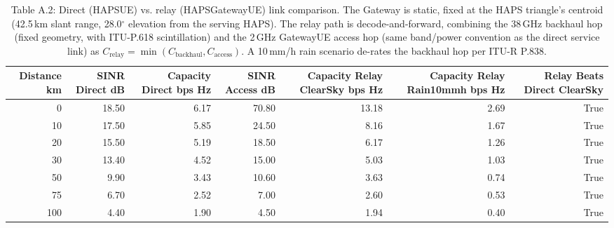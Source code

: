 \begin{table}[htbp]
\centering
\small
\begin{tabular}{rrrrrrr}
\toprule
Distance km & SINR Direct dB & Capacity Direct bps Hz & SINR Access dB & Capacity Relay ClearSky bps Hz & Capacity Relay Rain10mmh bps Hz & Relay Beats Direct ClearSky \\
\midrule
0 & 18.50 & 6.17 & 70.80 & 13.18 & 2.69 & True \\
10 & 17.50 & 5.85 & 24.50 & 8.16 & 1.67 & True \\
20 & 15.50 & 5.19 & 18.50 & 6.17 & 1.26 & True \\
30 & 13.40 & 4.52 & 15.00 & 5.03 & 1.03 & True \\
50 & 9.90 & 3.43 & 10.60 & 3.63 & 0.74 & True \\
75 & 6.70 & 2.52 & 7.00 & 2.60 & 0.53 & True \\
100 & 4.40 & 1.90 & 4.50 & 1.94 & 0.40 & True \\
\bottomrule
\end{tabular}

\caption{Table A.2: Direct (HAPS\textrightarrow UE) vs. relay (HAPS\textrightarrow Gateway\textrightarrow UE) link comparison. The Gateway is static, fixed at the HAPS triangle's centroid (42.5\,km slant range, 28.0$^\circ$ elevation from the serving HAPS). The relay path is decode-and-forward, combining the 38\,GHz backhaul hop (fixed geometry, with ITU-P.618 scintillation) and the 2\,GHz Gateway\textrightarrow UE access hop (same band/power convention as the direct service link) as $C_{\text{relay}} = \min(C_{\text{backhaul}}, C_{\text{access}})$. A 10\,mm/h rain scenario de-rates the backhaul hop per ITU-R P.838.}
\label{table:app-relay-comparison}
\end{table}
